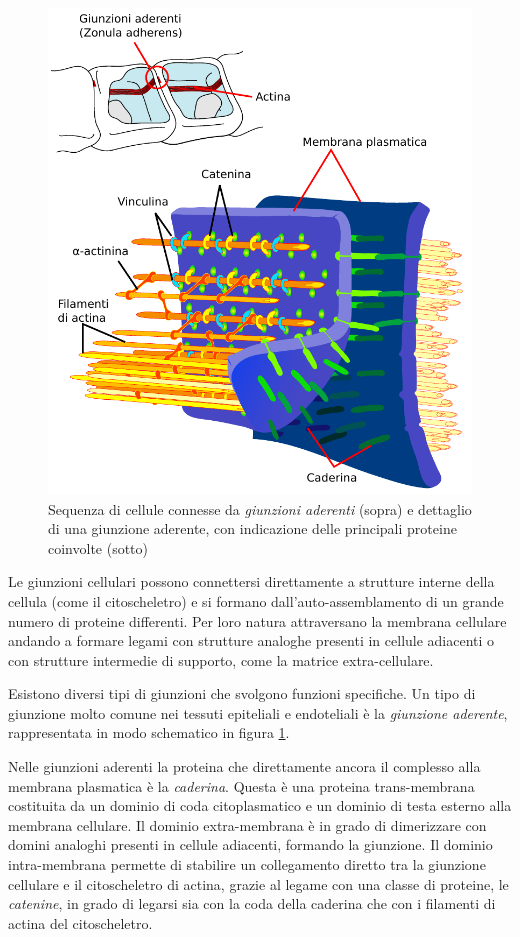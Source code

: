 \begin{figure}[ht]
    \centering
    \includegraphics[width=0.5\linewidth]{images/adjunc.pdf}
    \caption{Sequenza di cellule connesse da \emph{giunzioni aderenti}
        (sopra) e dettaglio di una giunzione aderente, con indicazione
        delle principali proteine coinvolte (sotto)}
    \label{fig:ad_jun}
\end{figure}

Le giunzioni cellulari possono connettersi direttamente a strutture
interne della cellula (come il citoscheletro) e si formano
dall'auto-assemblamento di un grande numero di proteine differenti.
Per loro natura attraversano la membrana cellulare andando a formare
legami con strutture analoghe presenti in cellule adiacenti o con
strutture intermedie di supporto, come la matrice extra-cellulare.

Esistono diversi tipi di giunzioni che svolgono funzioni specifiche.
Un tipo di giunzione molto comune nei tessuti epiteliali e 
endoteliali è la \emph{giunzione aderente}, rappresentata in modo
schematico in figura \ref{fig:ad_jun}.

Nelle giunzioni aderenti la proteina che direttamente ancora il
complesso alla membrana plasmatica è la \emph{caderina}.
Questa è una proteina trans-membrana costituita da un dominio di coda
citoplasmatico e un dominio di testa esterno alla membrana cellulare.
Il dominio extra-membrana è in grado di dimerizzare con domini
analoghi presenti in cellule adiacenti, formando la giunzione.
Il dominio intra-membrana permette di stabilire un collegamento
diretto tra la giunzione cellulare e il citoscheletro di actina,
grazie al legame con una classe di proteine, le \emph{catenine},
in grado di legarsi sia con la coda della caderina che con i filamenti
di actina del citoscheletro.

